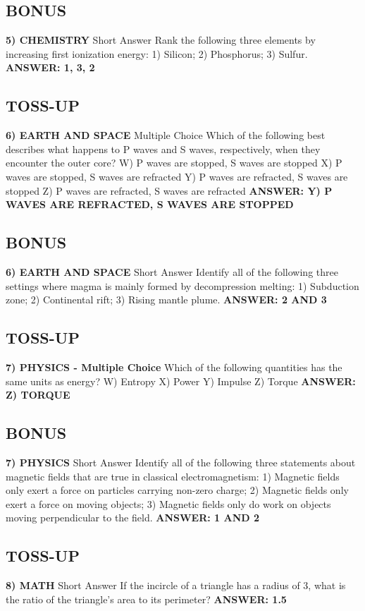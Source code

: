 \documentclass{article}
\begin{document}
\subsection*{BONUS}
\textbf{5) CHEMISTRY}
Short Answer Rank the following three elements by increasing first ionization energy: 1) Silicon; 2) Phosphorus; 3) Sulfur.
\textbf{ANSWER: 1, 3, 2}

\subsection*{TOSS-UP}
\textbf{6) EARTH AND SPACE}
Multiple Choice Which of the following best describes what happens to P waves and S waves, respectively, when they encounter the outer core?
W) P waves are stopped, S waves are stopped
X) P waves are stopped, S waves are refracted
Y) P waves are refracted, S waves are stopped
Z) P waves are refracted, S waves are refracted
\textbf{ANSWER: Y) P WAVES ARE REFRACTED, S WAVES ARE STOPPED}

\subsection*{BONUS}
\textbf{6) EARTH AND SPACE}
Short Answer Identify all of the following three settings where magma is mainly formed by decompression melting: 1) Subduction zone; 2) Continental rift; 3) Rising mantle plume.
\textbf{ANSWER: 2 AND 3}

\newpage

\subsection*{TOSS-UP}
\textbf{7) PHYSICS - Multiple Choice} Which of the following quantities has the same units as energy?
W) Entropy
X) Power
Y) Impulse
Z) Torque
\textbf{ANSWER: Z) TORQUE}

\subsection*{BONUS}
\textbf{7) PHYSICS}
Short Answer Identify all of the following three statements about magnetic fields that are true in classical electromagnetism: 1) Magnetic fields only exert a force on particles carrying non-zero charge; 2) Magnetic fields only exert a force on moving objects; 3) Magnetic fields only do work on objects moving perpendicular to the field.
\textbf{ANSWER: 1 AND 2}

\subsection*{TOSS-UP}
\textbf{8) MATH}
Short Answer If the incircle of a triangle has a radius of 3, what is the ratio of the triangle's area to its perimeter?
\textbf{ANSWER: 1.5}
\end{document}
